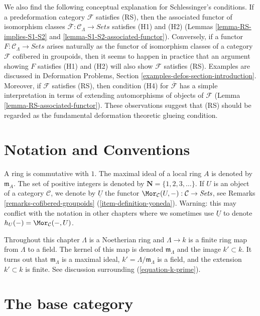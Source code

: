 \medskip\noindent
We also find the following conceptual explanation for Schlessinger's
conditions. If a predeformation category $\mathcal{F}$ satisfies (RS),
then the associated functor of isomorphism classes
$\overline{\mathcal{F}}: \mathcal{C}_\Lambda \to \textit{Sets}$
satisfies (H1) and (H2)
(Lemmas \ref{lemma-RS-implies-S1-S2} and
\ref{lemma-S1-S2-associated-functor}).
Conversely, if a functor
$F : \mathcal{C}_\Lambda \to \textit{Sets}$
arises naturally as the functor of isomorphism classes of
a category $\mathcal{F}$ cofibered in groupoids, then it seems to happen in
practice that an argument showing $F$ satisfies (H1) and (H2) will also show
$\mathcal{F}$ satisfies (RS). Examples are discussed in
Deformation Problems, Section
\ref{examples-defos-section-introduction}.
Moreover, if $\mathcal{F}$ satisfies (RS), then condition
(H4) for $\overline{\mathcal{F}}$ has a simple interpretation in terms of
extending automorphisms of objects of $\mathcal{F}$
(Lemma \ref{lemma-RS-associated-functor}).
These observations suggest that (RS) should be regarded as the
fundamental deformation theoretic glueing condition.




\section{Notation and Conventions}
\label{section-notations-conventions}

\noindent
A ring is commutative with $1$. The  maximal ideal of a local ring $A$
is denoted by $\mathfrak{m}_A$. The set of positive integers is denoted
by $\mathbf{N} = \{1, 2, 3, \ldots\}$. If $U$ is an object of a
category $\mathcal{C}$, we denote by $\underline{U}$
the functor
$\Mor_\mathcal{C}(U, -): \mathcal{C} \to \textit{Sets}$, see
Remarks \ref{remarks-cofibered-groupoids} (\ref{item-definition-yoneda}).
Warning: this may conflict with the notation in other chapters where we
sometimes use $\underline{U}$ to denote $h_U(-) = \Mor_\mathcal{C}(-, U)$.

\medskip\noindent
Throughout this chapter $\Lambda$ is a Noetherian ring and
$\Lambda \to k$ is a finite ring map from $\Lambda$ to a field.
The kernel of this map is denoted $\mathfrak m_\Lambda$ and the
image $k' \subset k$. It turns out that $\mathfrak m_\Lambda$ is
a maximal ideal, $k' = \Lambda/\mathfrak m_\Lambda$ is a field, and
the extension $k' \subset k$ is finite. See discussion surrounding
(\ref{equation-k-prime}).


\section{The base category}
\label{section-CLambda}

